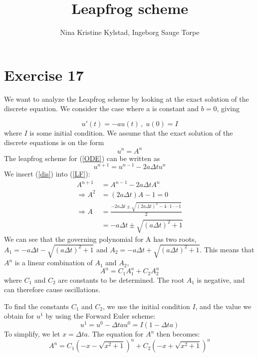\documentclass[12pt]{article} %
\title{Leapfrog scheme}
\author{Nina Kristine Kylstad, Ingeborg Sauge Torpe}
\newcommand{\Dt}{\Delta t}
\begin{document}
\maketitle

\section*{Exercise 17}

We want to analyze the Leapfrog scheme by looking at the exact solution of the discrete equation. We consider the case where a is constant and $b = 0$, giving

\begin{equation}
u'(t) = -au(t)\,,\;u(0) = I
\label{ODE}
\end{equation}
where $I$ is some initial condition. We assume that the exact solution of the discrete equations is on the form 
\begin{equation}
u^n = A^n
\label{dis}
\end{equation}
The leapfrog scheme for (\ref{ODE}) can be written as
\begin{equation}
u^{n+1} = u^{n-1} - 2a\Delta tu^n
\label{LF}
\end{equation}
We insert (\ref{dis}) into (\ref{LF}):
\begin{align*}
A^{n+1} &= A^{n-1} - 2a\Delta t A^n\\
\Rightarrow A^2 &= (2a\Delta t)A - 1  = 0\\
\Rightarrow A &= \frac{-2a\Delta t \pm \sqrt{(2a\Delta t )^2 - 4\cdot1\cdot-1}}{2}\\
&= -a\Delta t \pm  \sqrt{(a\Delta t )^2 +1}
\end{align*}
We can see that the governing polynomial for A has two roots, $A_1  = -a\Delta t - \sqrt{(a\Delta t )^2 +1}$ and $A_2 = -a\Delta t +  \sqrt{(a\Delta t )^2 +1}$. This means that $A^n$ is a linear combination of $A_1$ and $A_2$, 
\begin{equation}
A^n = C_1A_1^n + C_2A_2^n
\end{equation}
where $C_1$ and $C_2$ are constants to be determined. The root $A_1$ is negative, and can therefore cause oscillations.

To find the constants $C_1$ and $C_2$, we use the initial condition $I$, and the value we obtain for $u^1$ by using the Forward Euler scheme:
\[u^1 = u^0 - \Dt au^0 = I(1 - \Dt a)\]
To simplify, we let $x = \Dt a$. The equation for $A^n$ then becomes:
\begin{equation}
A^n = C_1(-x - \sqrt{x^2 +1})^n + C_2(-x + \sqrt{x^2 +1})^n
\end{equation}
\end{document}
